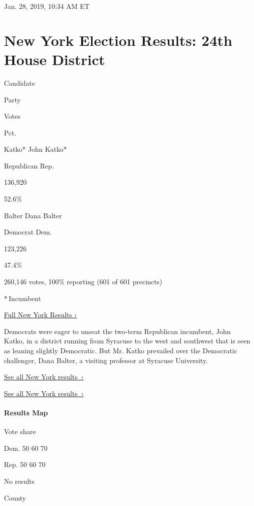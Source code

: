 Jan. 28, 2019, 10:34 AM ET

\hypertarget{new-york-election-results-24th-house-district}{%
\section{New York Election Results: 24th House
District}\label{new-york-election-results-24th-house-district}}

Candidate

Party

Votes

Pct.

 Katko* John Katko*

Republican Rep.

136,920

52.6\%

 Balter Dana Balter

Democrat Dem.

123,226

47.4\%

260,146 votes, 100\% reporting (601 of 601 precincts)

* Incumbent

\href{https://www.nytimes3xbfgragh.onion/interactive/2018/11/06/us/elections/results-new-york-elections.html}{Full
New York Results ›}

Democrats were eager to unseat the two-term Republican incumbent, John
Katko, in a district running from Syracuse to the west and southwest
that is seen as leaning slightly Democratic. But Mr. Katko prevailed
over the Democratic challenger, Dana Balter, a visiting professor at
Syracuse University.

\href{https://www.nytimes3xbfgragh.onion/interactive/2018/11/06/us/elections/results-new-york-elections.html}{See
all New York results~›}

\href{https://www.nytimes3xbfgragh.onion/interactive/2018/11/06/us/elections/results-new-york-elections.html}{See
all New York results~›}

\hypertarget{results-map}{%
\paragraph{Results Map}\label{results-map}}

Vote share

Dem. 50 60 70

Rep. 50 60 70

No results

County

